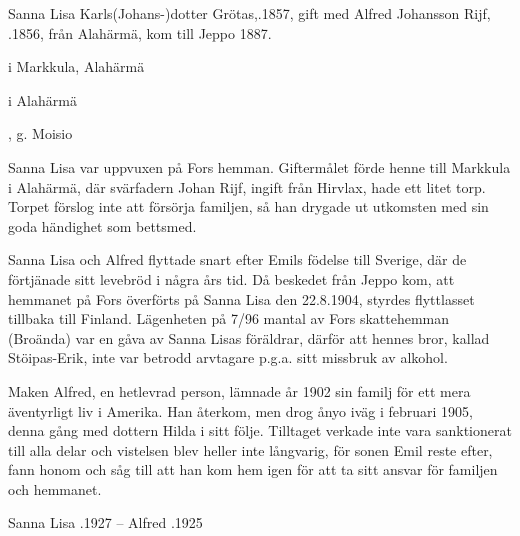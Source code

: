 Sanna Lisa Karls(Johans-)dotter Grötas,.1857, gift med Alfred Johansson Rijf, .1856, från Alahärmä, kom till Jeppo 1887.
\begin{jhchildren}
  \item {} i Markkula, Alahärmä
  \item {} i Alahärmä
  \item {}, g. Moisio
  \item {}
\end{jhchildren}
Sanna Lisa var uppvuxen på Fors hemman. Giftermålet förde henne till Markkula i Alahärmä, där svärfadern Johan Rijf, ingift från Hirvlax, hade ett litet torp. Torpet förslog inte att försörja familjen, så han drygade ut utkomsten med sin goda händighet som bettsmed.

Sanna Lisa och Alfred flyttade snart efter Emils födelse till Sverige, där de förtjänade sitt levebröd i några års tid. Då  beskedet från Jeppo kom, att hemmanet på Fors överförts på Sanna Lisa den 22.8.1904, styrdes flyttlasset tillbaka till Finland. Lägenheten på 7/96 mantal av Fors skattehemman (Broända) var en gåva av Sanna Lisas föräldrar, därför att hennes bror, kallad Stöipas-Erik, inte var 	betrodd arvtagare p.g.a. sitt missbruk av alkohol.

Maken Alfred, en hetlevrad person, lämnade år 1902 sin familj för ett mera äventyrligt liv i Amerika. Han återkom, men drog ånyo iväg i	februari 1905, denna gång med dottern Hilda i sitt följe. Tilltaget	verkade inte vara sanktionerat till alla delar och vistelsen blev heller	inte långvarig, för sonen Emil reste efter, fann honom och såg till att	han kom hem igen för att ta sitt ansvar för familjen och hemmanet.



Sanna Lisa .1927  --  Alfred .1925


